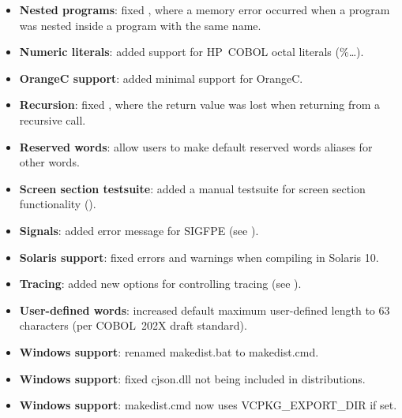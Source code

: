 \begin{itemize}
\item \textbf{Nested programs}: fixed , where a memory error occurred when a program was nested inside a program with the same name.
\item \textbf{Numeric literals}: added support for HP~COBOL octal literals (\%\ldots).
\item \textbf{OrangeC support}: added minimal support for OrangeC.
\item \textbf{Recursion}: fixed , where the return value was lost when returning from a recursive call.
\item \textbf{Reserved words}: allow users to make default reserved words aliases for other words.
\item  \textbf{Screen section testsuite}: added a manual testsuite for screen section functionality ().
\item \textbf{Signals}: added error message for SIGFPE (see ).
\item \textbf{Solaris support}: fixed errors and warnings when compiling in Solaris 10.
\item \textbf{Tracing}: added new options for controlling tracing (see ).
\item \textbf{User-defined words}: increased default maximum user-defined length to 63 characters (per COBOL~202X draft standard).
\item \textbf{Windows support}: renamed makedist.bat to makedist.cmd.
\item \textbf{Windows support}: fixed cjson.dll not being included in distributions.
\item \textbf{Windows support}: makedist.cmd now uses VCPKG\_EXPORT\_DIR if set.
\end{itemize}

